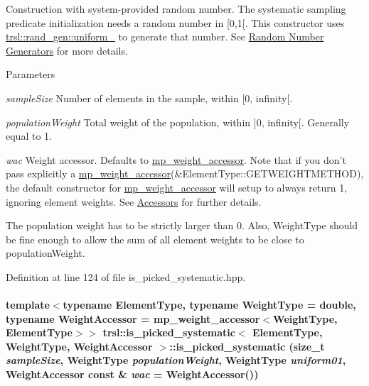 Construction with system-\/provided random number. The systematic sampling predicate initialization needs a random number in {\ttfamily \mbox{[}0,1\mbox{[}}. This constructor uses \hyperlink{namespacetrsl_1_1rand__gen_af0b1115635aac6b7eff68ca6e6846652}{trsl::rand\_\-gen::uniform\_} to generate that number. See \hyperlink{group__random}{Random Number Generators} for more details.


\begin{DoxyParams}{Parameters}
\item[{\em sampleSize}]Number of elements in the sample, within {\ttfamily \mbox{[}0, infinity\mbox{[}}.\item[{\em populationWeight}]Total weight of the population, within {\ttfamily \mbox{]}0, infinity\mbox{[}}. Generally equal to 1.\item[{\em wac}]Weight accessor. Defaults to \hyperlink{classtrsl_1_1mp__weight__accessor}{mp\_\-weight\_\-accessor}. Note that if you don't pass explicitly a \hyperlink{classtrsl_1_1mp__weight__accessor}{mp\_\-weight\_\-accessor}({\ttfamily \&ElementType::GETWEIGHTMETHOD}), the default constructor for \hyperlink{classtrsl_1_1mp__weight__accessor}{mp\_\-weight\_\-accessor} will setup to always return 1, ignoring element weights. See \hyperlink{group__accessor}{Accessors} for further details.\end{DoxyParams}
The population weight has to be strictly larger than 0. Also, {\ttfamily WeightType} should be fine enough to allow the sum of all element weights to be close to {\ttfamily populationWeight}. 

Definition at line 124 of file is\_\-picked\_\-systematic.hpp.\hypertarget{classtrsl_1_1is__picked__systematic_abc605b982bcf8ff63eedcd95e4d1e64a}{
\paragraph[{is\_\-picked\_\-systematic}]{\setlength{\rightskip}{0pt plus 5cm}template$<$typename ElementType, typename WeightType = double, typename WeightAccessor = mp\_\-weight\_\-accessor$<$WeightType, ElementType$>$$>$ {\bf trsl::is\_\-picked\_\-systematic}$<$ ElementType, WeightType, WeightAccessor $>$::{\bf is\_\-picked\_\-systematic} (size\_\-t {\em sampleSize}, \/  WeightType {\em populationWeight}, \/  WeightType {\em uniform01}, \/  WeightAccessor const \& {\em wac} = {\ttfamily WeightAccessor()})}\hfill}
\label{classtrsl_1_1is__picked__systematic_abc605b982bcf8ff63eedcd95e4d1e64a}


